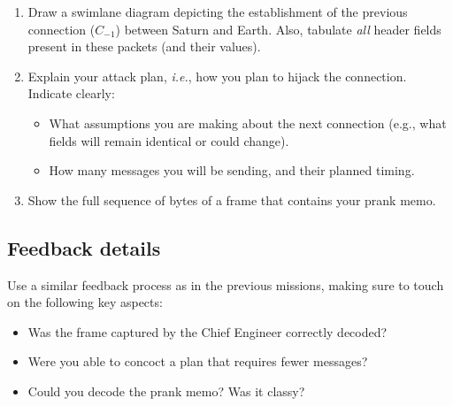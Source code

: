 \begin{enumerate}[itemsep=0.1cm]
\item Draw a swimlane diagram depicting the establishment of the previous connection ($C_{-1}$) between Saturn and Earth.
Also, tabulate \textit{all} header fields present in these packets (and their values).

\item Explain your attack plan, \textit{i.e.}, how you plan to hijack the connection. Indicate clearly:
    \begin{itemize}
    \item What assumptions you are making about the next connection (e.g., what fields will remain identical or could change).
    \item How many messages you will be sending, and their planned timing.
    \end{itemize}

\item Show the full sequence of bytes of a frame that contains your prank memo.
\end{enumerate}

\subsection*{Feedback details}

Use a similar feedback process as in the previous missions, making sure to touch on the following key aspects:
\begin{itemize}
\item Was the frame captured by the Chief Engineer correctly decoded?
\item Were you able to concoct a plan that requires fewer messages?
\item Could you decode the prank memo? Was it classy?
\end{itemize}
